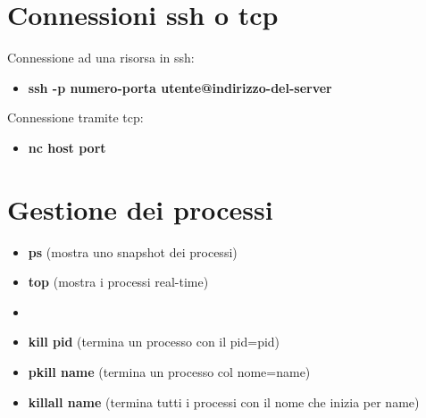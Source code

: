 \documentclass[oneside,a4paper,11pt]{book}
\theoremstyle{italicstyle}
\theoremstyle{normStyle}
\begin{document}
\section{Connessioni ssh o tcp}
Connessione ad una risorsa in ssh:

\begin{itemize}
    \item \textbf{ssh -p numero-porta utente@indirizzo-del-server}
\end{itemize}

Connessione tramite tcp:

\begin{itemize}
    \item \textbf{nc host port}
\end{itemize}

\section{Gestione dei processi}
\begin{itemize}
    \item \textbf{ps} (mostra uno snapshot dei processi)
    \item \textbf{top} (mostra i processi real-time)\item \textbf{}
    \item \textbf{kill pid} (termina un processo con il pid=pid)
    \item \textbf{pkill name} (termina un processo col nome=name)
    \item \textbf{killall name} (termina tutti i processi con il nome che inizia per name)
\end{itemize}


\end{document}
